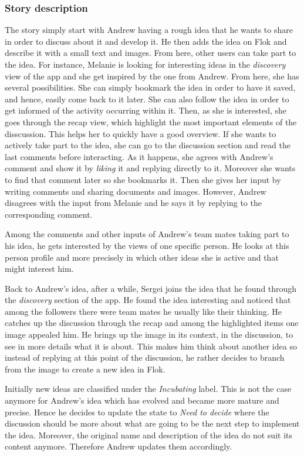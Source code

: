 \documentclass[a4paper,12pt,twoside]{article}
\begin{document}
\subsubsection*{Story description}
The story simply start with Andrew having a rough idea that he wants to share in order to discuss about it and develop it.
He then adds the idea on Flok and describe it with a small text and images.
From here, other users can take part to the idea. For instance, Melanie is looking for interesting ideas in the \emph{discovery} view of the app and she get inspired by the one from Andrew.
From here, she has several possibilities.
She can simply bookmark the idea in order to have it saved, and hence, easily come back to it later.
She can also follow the idea in order to get informed of the activity occurring within it.
Then, as she is interested, she goes through the recap view, which highlight the most important elements of the disscussion.
This helps her to quickly have a good overview.
If she wants to actively take part to the idea, she can go to the discussion section and read the last comments before interacting.
As it happens, she agrees with Andrew's comment and show it by \emph{liking} it and replying directly to it.
Moreover she wants to find that comment later so she bookmarks it.
Then she gives her input by writing comments and sharing documents and images.
However, Andrew disagrees with the input from Melanie and he says it by replying to the corresponding comment.

Among the comments and other inputs of Andrew's team mates taking part to his idea, he gets interested by the views of one specific person.
He looks at this person profile and more precisely in which other ideas she is active and that might interest him.

Back to Andrew's idea, after a while, Sergei joins the idea that he found through the \emph{discovery} section of the app.
He found the idea interesting and noticed that among the followers there were team mates he usually like their thinking.
He catches up the discussion through the recap and among the highlighted items one image appealed him.
He brings up the image in its context, in the discussion, to see in more details what it is about.
This makes him think about another idea so instead of replying at this point of the discussion, he rather decides to branch from the image to create a new idea in Flok.

Initially new ideas are classified under the \emph{Incubating} label.
This is not the case anymore for Andrew's idea which has evolved and became more mature and precise.
Hence he decides to update the state to \emph{Need to decide} where the discussion should be more about what are going to be the next step to implement the idea.
Moreover, the original name and description of the idea do not suit its content anymore.
Therefore Andrew updates them accordingly.
\end{document}
